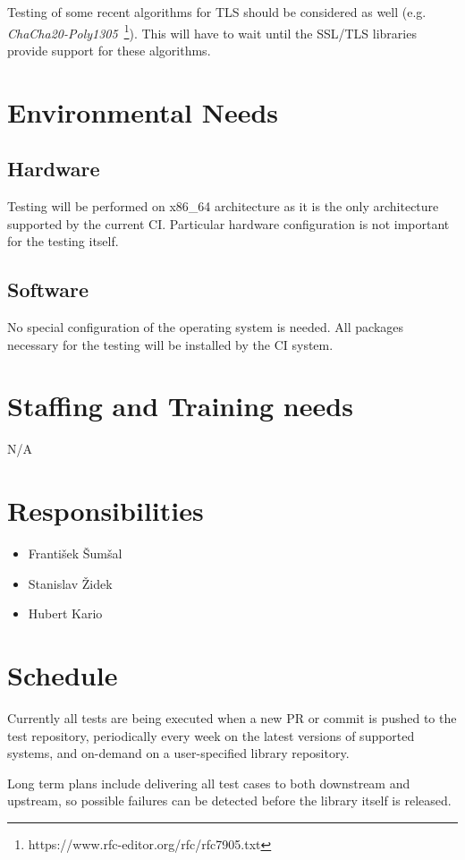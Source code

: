     Testing of some recent algorithms for TLS should be considered as well
    (e.g. \textit{ChaCha20-Poly1305}~\footnote{https://www.rfc-editor.org/rfc/rfc7905.txt}).
    This will have to wait until the SSL/TLS libraries provide support for
    these algorithms.

\section{Environmental Needs}
\subsection{Hardware}
    Testing will be performed on x86\_64 architecture as it is the only architecture
    supported by the current CI. Particular hardware configuration is not important
    for the testing itself.

\subsection{Software}
    No special configuration of the operating system is needed. All packages
    necessary for the testing will be installed by the CI system.

\section{Staffing and Training needs}
    N/A

\section{Responsibilities}
    \begin{itemize}
        \item František Šumšal
        \item Stanislav Židek
        \item Hubert Kario
    \end{itemize}

\section{Schedule}
    Currently all tests are being executed when a new PR or commit is pushed
    to the test repository, periodically every week on the latest versions
    of supported systems, and on-demand on a user-specified library repository.

    Long term plans include delivering all test cases to both downstream and
    upstream, so possible failures can be detected before the library itself
    is released.

